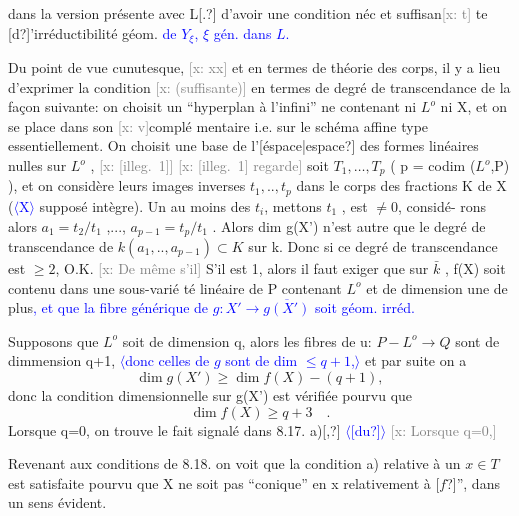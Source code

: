 \documentclass[11pt]{article}
\newcommand{\scanpage}[1]{\par\bigskip\noindent{\small\sffamily[scan #1]}\par}
\newcommand{\mspage}[1]{{\small\sffamily[p.\,#1]}}
\newcommand{\hand}[1]{\textcolor{blue}{#1}}
\newcommand{\inserted}[2][]{\textcolor{blue}{$\langle$#2$\rangle$}}
\newcommand{\xout}[1]{\textcolor{gray}{[\textsf{x:} #1]}}
\newcommand{\unsure}[1]{[#1?]}
\newcommand{\illegible}[1]{[\textsf{illeg.\ #1}]}
\begin{document}
\mspage{53}

\clearpage
\scanpage{25/54}
\mspage{49}

dans la version présente  avec L\unsure{.} d'avoir une condition néc et suffisan\xout{t}%
te \unsure{d}'irréductibilité géom. \hand{de $Y_\xi$, $\xi$ gén. dans $L$.}

Du point de vue cunutesque, \xout{xx} et en termes de théorie des
corps, il y a lieu d'exprimer la condition \xout{(suffisante)} en termes de
degré de transcendance de la façon suivante: on choisit un ``hyperplan
à l'infini'' ne contenant ni $L^{o}$ ni X, et on se place dans son \xout{v}complé%
mentaire i.e. sur le schéma affine  type essentiellement. On choisit
une base de l'\unsure{éspace|espace} des formes linéaires nulles sur $L^{o}$ , \xout{\illegible{1}}
\xout{\illegible{1} regarde} soit $T_{1},\ldots,T_{p}$ ( p = codim ($L^{o}$,P) ), et on considère
leurs images inverses $t_{1},..,t_{p}$ dans le corps des fractions K de X
(\inserted{X} supposé intègre). Un au moins des $t_{i}$, mettons $t_{1}$ , est $\neq 0$, considé-%
rons alors $a_{1} = t_{2}/t_{1}$ ,..., $a_{p-1} = t_{p}/t_{1}$ . Alors dim g(X') n'est
autre que le degré de transcendance de $k(a_{1},..,a_{p-1}) \subset K$ sur k. Donc
si ce degré de transcendance est $\geqslant 2$, O.K. \xout{De même s'il} S'il est 1,
alors il faut exiger que sur $\bar{k}$ , f(X) soit contenu dans une sous-varié%
té linéaire de P contenant $L^{o}$ et de dimension une de plus\hand{, et que la
fibre générique de $g : X' \to \overline{g(X')}$ soit géom. irréd.}

Supposons que $L^{o}$ soit de dimension q, alors les fibres de u:
$P - L^{o} \to Q$ sont de dimmension q+1, \inserted{donc celles de $g$ sont de dim $\leq q+1$,} et par suite on a
\[ \dim g(X') \geqslant \dim f(X) - (q+1) , \]
donc la condition dimensionnelle sur g(X') est vérifiée pourvu que
\[ \dim f(X) \geqslant q+3 \quad . \]
Lorsque q=0, on trouve le fait signalé dans 8.17. a)\unsure{,} \inserted{\unsure{du}} \xout{Lorsque q=0,}

Revenant aux conditions de 8.18. on voit que la condition a)
relative à un $x \in T$ est satisfaite pourvu que X ne soit pas ``conique''
en x relativement à \unsure{$f$}'', dans un sens évident.
\end{document}
